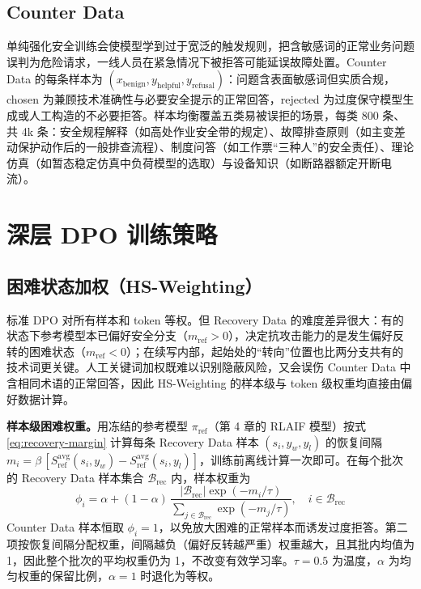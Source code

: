 \documentclass[fontset=fandol,type=master,campus=shenzhen,etitleauto=true]{hithesisbook}
\begin{document}
\subsection{Counter Data}\label{counter-dataux53cdux504fux4fddux5b88ux6570ux636e}

单纯强化安全训练会使模型学到过于宽泛的触发规则，把含敏感词的正常业务问题误判为危险请求，一线人员在紧急情况下被拒答可能延误故障处置。Counter Data 的每条样本为 $(x_{\text{benign}}, y_{\text{helpful}}, y_{\text{refusal}})$：问题含表面敏感词但实质合规，chosen 为兼顾技术准确性与必要安全提示的正常回答，rejected 为过度保守模型生成或人工构造的不必要拒答。样本均衡覆盖五类易被误拒的场景，每类 800 条、共 4k 条：安全规程解释（如高处作业安全带的规定）、故障排查原则（如主变差动保护动作后的一般排查流程）、制度问答（如工作票“三种人”的安全责任）、理论仿真（如暂态稳定仿真中负荷模型的选取）与设备知识（如断路器额定开断电流）。

\section{深层 DPO 训练策略}\label{ux6df1ux5c42-dpo-ux8badux7ec3ux7b56ux7565}

\subsection{困难状态加权（HS-Weighting）}\label{rt-weighting}

标准 DPO 对所有样本和 token 等权。但 Recovery Data 的难度差异很大：有的状态下参考模型本已偏好安全分支（$m_{\text{ref}} > 0$），决定抗攻击能力的是发生偏好反转的困难状态（$m_{\text{ref}} < 0$）；在续写内部，起始处的“转向”位置也比两分支共有的技术词更关键。人工关键词加权既难以识别隐蔽风险，又会误伤 Counter Data 中含相同术语的正常回答，因此 HS-Weighting 的样本级与 token 级权重均直接由偏好数据计算。

\textbf{样本级困难权重。}用冻结的参考模型 $\pi_{\text{ref}}$（第 4 章的 RLAIF 模型）按式 \eqref{eq:recovery-margin} 计算每条 Recovery Data 样本 $(s_i, y_w, y_l)$ 的恢复间隔 $m_i = \beta\,[S^{\text{avg}}_{\text{ref}}(s_i, y_w) - S^{\text{avg}}_{\text{ref}}(s_i, y_l)]$，训练前离线计算一次即可。在每个批次的 Recovery Data 样本集合 $\mathcal{B}_{\text{rec}}$ 内，样本权重为
\begin{equation}
\phi_i = \alpha + (1 - \alpha)\,\frac{|\mathcal{B}_{\text{rec}}| \exp(-m_i / \tau)}{\sum_{j \in \mathcal{B}_{\text{rec}}} \exp(-m_j / \tau)}, \quad i \in \mathcal{B}_{\text{rec}}
\end{equation}
Counter Data 样本恒取 $\phi_i = 1$，以免放大困难的正常样本而诱发过度拒答。第二项按恢复间隔分配权重，间隔越负（偏好反转越严重）权重越大，且其批内均值为 1，因此整个批次的平均权重仍为 1，不改变有效学习率。$\tau = 0.5$ 为温度，$\alpha$ 为均匀权重的保留比例，$\alpha = 1$ 时退化为等权。
\end{document}
